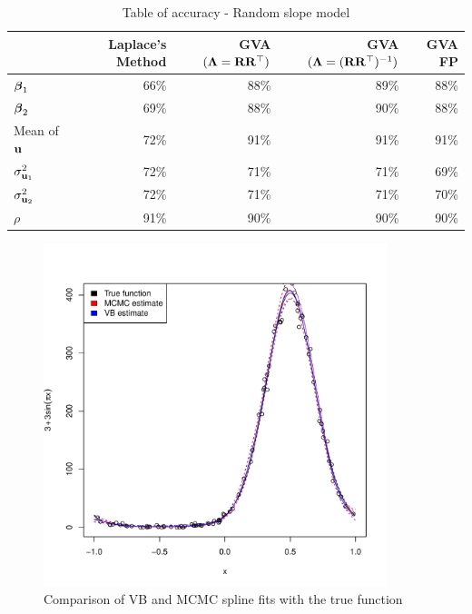 \documentclass{article}[12pt]
\begin{document}
\begin{table}
\caption{Table of accuracy - Random slope model}
\label{tab:accuracy_slope}
\begin{tabular}{|l|rrrr|}
\hline
& Laplace's Method & GVA $({\boldsymbol \Lambda} = {\bf R} {\bf R}^\top)$ & GVA $({\boldsymbol \Lambda} = ({\bf R} {\bf R}^\top)^{-1})$ & GVA FP\\
\hline
${\boldsymbol \beta}_1$   &66\%&88\%&89\%&88\%\\
${\boldsymbol \beta}_2$   &69\%&88\%&90\%&88\%\\
Mean of ${\bf u}$    &72\%&91\%&91\%&91\%\\
$\sigma^2_{{\bf u}_1}$ &72\%&71\%&71\%&69\%\\
$\sigma^2_{{\bf u}_2}$ &72\%&71\%&71\%&70\%\\
$\rho$ &91\%&90\%&90\%&90\%\\
\hline
\end{tabular}
\end{table}


\begin{figure}
\label{fig:spline}
\caption{Comparison of VB and MCMC spline fits with the true function}
\includegraphics[width=100mm, height=100mm]{code/results/accuracy_plots_spline_gva2.pdf}
\end{figure}
\end{document}

